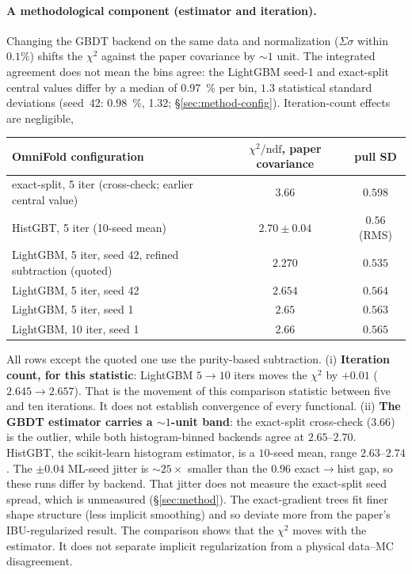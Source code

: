 \paragraph{A methodological component (estimator and iteration).} Changing the GBDT backend on the same data and normalization ($\Sigma\sigma$ within $0.1\%$) shifts the $\chi^{2}$ against the paper covariance by $\sim1$ unit. The integrated agreement does not mean the bins agree: the LightGBM seed-1 and exact-split central values differ by a median of \SI{0.97}{\percent} per bin, $1.3$ statistical standard deviations (seed~42: \SI{0.98}{\percent}, 1.32; \S\ref{sec:method-config}). Iteration-count effects are negligible,
\begin{center}
\begin{tabular}{@{}lcc@{}}
\toprule
OmniFold configuration & $\chi^{2}/\mathrm{ndf}$, paper covariance & pull SD \\
\midrule
exact-split, 5 iter (cross-check; earlier central value) & $3.66$ & $0.598$ \\
HistGBT, 5 iter (10-seed mean) & $2.70\pm0.04$ & $0.56$ (RMS) \\
LightGBM, 5 iter, seed 42, refined subtraction (quoted) & $2.270$ & $0.535$ \\
LightGBM, 5 iter, seed 42 & $2.654$ & $0.564$ \\
LightGBM, 5 iter, seed 1 & $2.65$ & $0.563$ \\
LightGBM, 10 iter, seed 1 & $2.66$ & $0.565$ \\
\bottomrule
\end{tabular}
\end{center}
All rows except the quoted one use the purity-based subtraction. (i) \textbf{Iteration count, for this statistic}: LightGBM $5\to10$ iters moves the $\chi^{2}$ by $+0.01$ ($2.645\to2.657$). That is the movement of this comparison statistic between five and ten iterations. It does not establish convergence of every functional. (ii) \textbf{The GBDT estimator carries a $\sim1$-unit band}: the exact-split cross-check ($3.66$) is the outlier, while both histogram-binned backends agree at $2.65$--$2.70$. HistGBT, the scikit-learn histogram estimator, is a $10$-seed mean, range $2.63$--$2.74$. The $\pm0.04$ ML-seed jitter is $\sim25\times$ smaller than the $0.96$ exact$\to$hist gap, so these runs differ by backend. That jitter does not measure the exact-split seed spread, which is unmeasured (\S\ref{sec:method}). The exact-gradient trees fit finer shape structure (less implicit smoothing) and so deviate more from the paper's IBU-regularized result. The comparison shows that the $\chi^{2}$ moves with the estimator. It does not separate implicit regularization from a physical data--MC disagreement.

